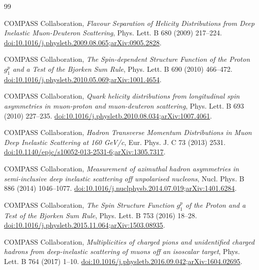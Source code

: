 \documentclass[11pt,a4paper]{article}
\begin{document}
\clearpage\begin{thebibliography}{99}\raggedright
{} COMPASS Collaboration,
\emph{Flavour Separation of Helicity Distributions from Deep Inelastic Muon-Deuteron Scattering},
Phys. Lett. B 680 (2009) 217--224.
\href{https://doi.org/10.1016/j.physletb.2009.08.065}{doi:10.1016/j.physletb.2009.08.065};\quad\href{https://arxiv.org/abs/0905.2828}{arXiv:0905.2828}.

 COMPASS Collaboration,
\emph{The Spin-dependent Structure Function of the Proton $g_1^p$ and a Test of the Bjorken Sum Rule},
Phys. Lett. B 690 (2010) 466--472.
\href{https://doi.org/10.1016/j.physletb.2010.05.069}{doi:10.1016/j.physletb.2010.05.069};\quad\href{https://arxiv.org/abs/1001.4654}{arXiv:1001.4654}.

 COMPASS Collaboration,
\emph{Quark helicity distributions from longitudinal spin asymmetries in muon-proton and muon-deuteron scattering},
Phys. Lett. B 693 (2010) 227--235.
\href{https://doi.org/10.1016/j.physletb.2010.08.034}{doi:10.1016/j.physletb.2010.08.034};\quad\href{https://arxiv.org/abs/1007.4061}{arXiv:1007.4061}.

 COMPASS Collaboration,
\emph{Hadron Transverse Momentum Distributions in Muon Deep Inelastic Scattering at 160 GeV/c},
Eur. Phys. J. C 73 (2013) 2531.
\href{https://doi.org/10.1140/epjc/s10052-013-2531-6}{doi:10.1140/epjc/s10052-013-2531-6};\quad\href{https://arxiv.org/abs/1305.7317}{arXiv:1305.7317}.

 COMPASS Collaboration,
\emph{Measurement of azimuthal hadron asymmetries in semi-inclusive deep inelastic scattering off unpolarised nucleons},
Nucl. Phys. B 886 (2014) 1046--1077.
\href{https://doi.org/10.1016/j.nuclphysb.2014.07.019}{doi:10.1016/j.nuclphysb.2014.07.019};\quad\href{https://arxiv.org/abs/1401.6284}{arXiv:1401.6284}.

 COMPASS Collaboration,
\emph{The Spin Structure Function $g_1^p$ of the Proton and a Test of the Bjorken Sum Rule},
Phys. Lett. B 753 (2016) 18--28.
\href{https://doi.org/10.1016/j.physletb.2015.11.064}{doi:10.1016/j.physletb.2015.11.064};\quad\href{https://arxiv.org/abs/1503.08935}{arXiv:1503.08935}.

 COMPASS Collaboration,
\emph{Multiplicities of charged pions and unidentified charged hadrons from deep-inelastic scattering of muons off an isoscalar target},
Phys. Lett. B 764 (2017) 1--10.
\href{https://doi.org/10.1016/j.physletb.2016.09.042}{doi:10.1016/j.physletb.2016.09.042};\quad\href{https://arxiv.org/abs/1604.02695}{arXiv:1604.02695}.


\end{thebibliography}
\end{document}
